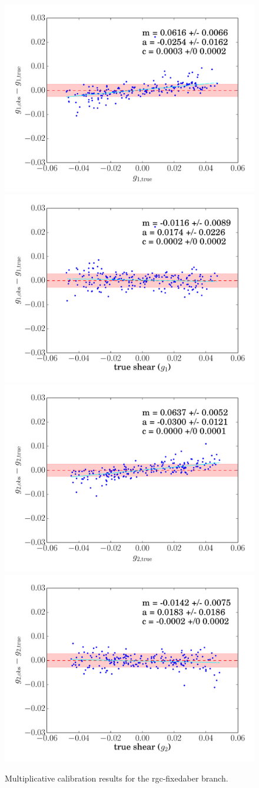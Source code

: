\documentclass[iop]{emulateapj}
\begin{document}
\begin{figure}[t]
\begin{center}
\includegraphics[width=0.48\linewidth]{./Plots/m1-no_corrections-rgc-fixedaber-regauss.pdf}
\includegraphics[width=0.48\linewidth]{./Plots/m1-rgc-fixedaber-regauss-opt-shear_plots.pdf}
\includegraphics[width=0.48\linewidth]{./Plots/m2-no_corrections-rgc-fixedaber-regauss.pdf}
\includegraphics[width=0.48\linewidth]{./Plots/m2-rgc-fixedaber-regauss-opt-shear_plots.pdf}
\end{center}
\caption{Multiplicative calibration results for the rgc-fixedaber
  branch.}
\end{figure}
\end{document}
